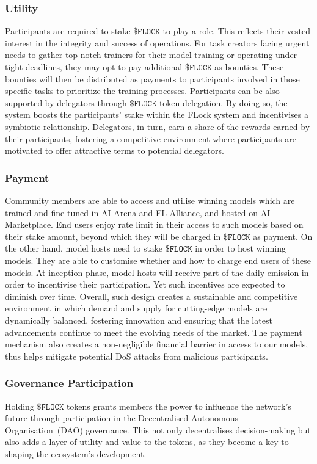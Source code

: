 \documentclass[conference]{IEEEtran}
\newcommand{\FML}{\ensuremath{\xspace\texttt{\$FLOCK}}\xspace}
\begin{document}
\subsubsection{Utility}
Participants are required to stake \FML to play a role. This reflects their vested interest in the integrity and success of operations. For task creators facing urgent needs to gather top-notch trainers for their model training or operating under tight deadlines, they may opt to pay additional \FML as bounties. These bounties will then be distributed as payments to participants involved in those specific tasks to prioritize the training processes. Participants can be also supported by delegators through \FML token delegation. By doing so, the system  boosts the participants' stake within the FLock system and incentivises a symbiotic relationship. Delegators, in turn, earn a share of the rewards earned by their participants, fostering a competitive environment where participants are motivated to offer attractive terms to potential delegators.
 
\subsubsection{Payment} 
Community members are able to access and utilise winning models which are trained and fine-tuned in AI Arena and FL Alliance, and hosted on AI Marketplace. End users enjoy rate limit in their access to such models based on their stake amount, beyond which they will be charged in \FML as payment. On the other hand, model hosts need to stake \FML in order to host winning models. They are able to customise whether and how to charge end users of these models. At inception phase, model hosts will receive part of the daily emission in order to incentivise their participation. Yet such incentives are expected to diminish over time. Overall, such design creates a sustainable and competitive environment in which demand and supply for cutting-edge models are dynamically balanced, fostering innovation and ensuring that the latest advancements continue to meet the evolving needs of the market. The payment mechanism also creates a non-negligible financial barrier in access to our models, thus helps mitigate potential DoS attacks from malicious participants.

\subsubsection{Governance Participation} Holding \FML tokens grants members the power to influence the network's future through participation in the Decentralised Autonomous Organisation~(DAO) governance. This not only decentralises decision-making but also adds a layer of utility and value to the tokens, as they become a key to shaping the ecosystem's development.
\end{document}
